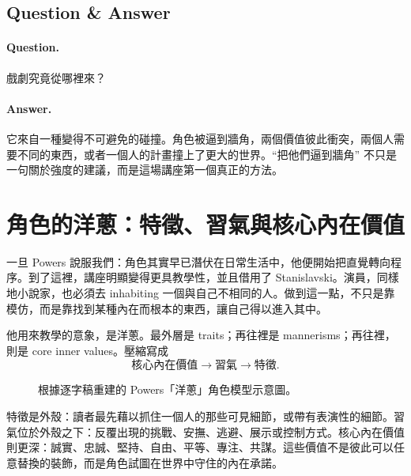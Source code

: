 \subsection{Question \& Answer}

\paragraph{Question.} 戲劇究竟從哪裡來？

\paragraph{Answer.} 它來自一種變得不可避免的碰撞。角色被逼到牆角，兩個價值彼此衝突，兩個人需要不同的東西，或者一個人的計畫撞上了更大的世界。``把他們逼到牆角'' 不只是一句關於強度的建議，而是這場講座第一個真正的方法。

\section{角色的洋蔥：特徵、習氣與核心內在價值}

一旦 Powers 說服我們：角色其實早已潛伏在日常生活中，他便開始把直覺轉向程序。到了這裡，講座明顯變得更具教學性，並且借用了 Stanislavski。演員，同樣地小說家，也必須去 inhabiting 一個與自己不相同的人。做到這一點，不只是靠模仿，而是靠找到某種內在而根本的東西，讓自己得以進入其中。

他用來教學的意象，是洋蔥。最外層是 traits；再往裡是 mannerisms；再往裡，則是 core inner values。壓縮寫成
\begin{equation}
\text{核心內在價值} \to \text{習氣} \to \text{特徵}.
\end{equation}

\begin{figure}[h]
\centering
{}
\caption{根據逐字稿重建的 Powers「洋蔥」角色模型示意圖。}
\end{figure}

特徵是外殼：讀者最先藉以抓住一個人的那些可見細節，或帶有表演性的細節。習氣位於外殼之下：反覆出現的挑戰、安撫、逃避、展示或控制方式。核心內在價值則更深：誠實、忠誠、堅持、自由、平等、專注、共謀。這些價值不是彼此可以任意替換的裝飾，而是角色試圖在世界中守住的內在承諾。

